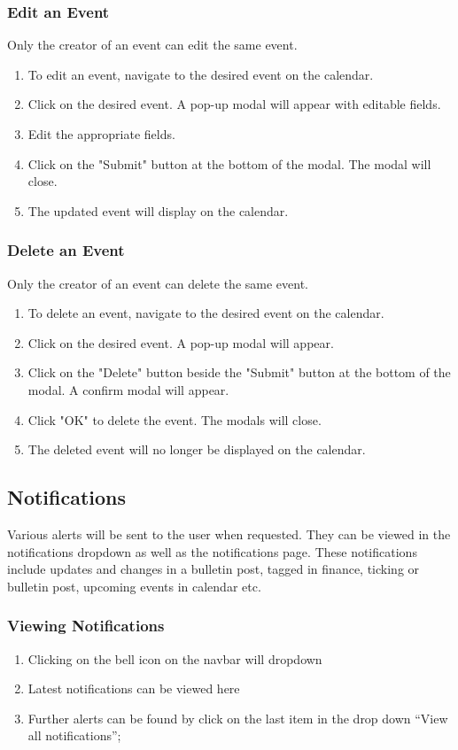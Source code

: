 \documentclass[12pt]{article}
\begin{document}
    \subsubsection{Edit an Event}
    Only the creator of an event can edit the same event.
    \begin{enumerate}
        \item To edit an event, navigate to the desired event on the calendar.
        \item Click on the desired event. A pop-up modal will appear with editable fields.
        \item Edit the appropriate fields.
        \item Click on the "Submit" button at the bottom of the modal. The modal will close.
        \item The updated event will display on the calendar.
    \end{enumerate}
    
    \subsubsection{Delete an Event}
    Only the creator of an event can delete the same event.
    \begin{enumerate}
        \item To delete an event, navigate to the desired event on the calendar.
        \item Click on the desired event. A pop-up modal will appear.
        \item Click on the "Delete" button beside the "Submit" button at the bottom of the modal.  A confirm modal will appear.
        \item Click "OK" to delete the event. The modals will close.
        \item The deleted event will no longer be displayed on the calendar.
    \end{enumerate}
    
    \subsection{Notifications}
    Various alerts will be sent to the user when requested. They can be viewed in the notifications dropdown as well as the notifications page.
    These notifications include updates and changes in a bulletin post, tagged in finance, ticking or bulletin post, upcoming events in calendar etc.
    \subsubsection{Viewing Notifications}
    \begin{enumerate}
        \item Clicking on the bell icon on the navbar will dropdown
        \item Latest notifications can be viewed here
        \item Further alerts can be found by click on the last item in the drop down ``View all notifications'';
    \end{enumerate}
\end{document}
